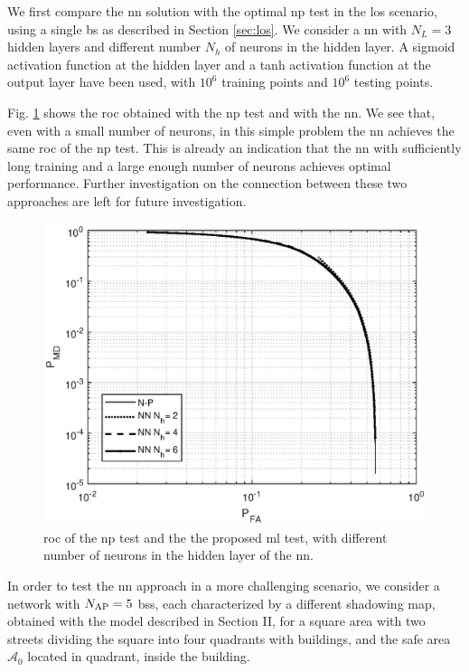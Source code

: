 \documentclass[conference,draftcls,onecolumn]{IEEEtran}
\begin{document}
We first compare the \ac{nn} solution with the optimal \ac{np} test in the \ac{los} scenario, using a single \ac{bs} as described in Section \ref{sec:los}. We consider a \ac{nn} with $N_L=3$ hidden layers and different number $N_h$ of neurons in the hidden layer. A sigmoid activation function at the hidden layer and a tanh activation function at the output layer have been used, with $10^6$ training points  and $10^6$ testing points. 

Fig. \ref{fig:NP_comp} shows the \ac{roc} obtained with the \ac{np} test and with the \ac{nn}. We see that, even with a small number of neurons, in this simple problem the \ac{nn} achieves the same \ac{roc} of the \ac{np} test. This is already an indication that the \ac{nn} with sufficiently long training and a large enough number of neurons achieves optimal performance. Further investigation on the connection between these two approaches are left for future  investigation.
 
 \begin{figure}[h]
     \centering
     \includegraphics[width=0.9\columnwidth]{FA_MD_LOS.eps}
     \caption{\ac{roc} of the \ac{np} test and the the proposed \ac{ml} test,  with different number of neurons in the hidden layer of the \ac{nn}.}
     \label{fig:NP_comp}
 \end{figure}

 
In order to test the \ac{nn} approach in a more challenging scenario, we consider a network with $N_{\rm AP}=5$ \acp{bs}, each  characterized by a different  shadowing map, obtained with the model described in Section II, for a square area with two streets dividing the square into four quadrants with buildings, and the safe area $\mathcal A_0$  located in quadrant, inside the building.
\end{document}
